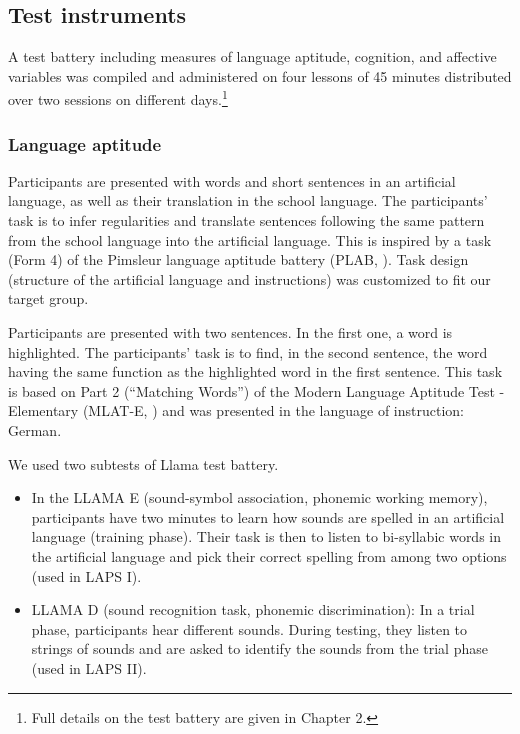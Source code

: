 \documentclass[output=paper]{langsci/langscibook}
\begin{document}
\subsection{Test instruments} 

A test battery including measures of language aptitude, cognition, and affective variables was compiled and administered on four lessons of 45 minutes distributed over two sessions on different days.\footnote{Full details on the test battery are given in Chapter 2.}

\subsubsection{Language aptitude}

\begin{description}\sloppy
\item[Inductive ability (ind):] Participants are presented with words and short sentences in an artificial language, as well as their translation in the school language. The participants’ task is to infer regularities and translate sentences following the same pattern from the school language into the artificial language. This is inspired by a task (Form 4) of the Pimsleur language aptitude battery (PLAB, \citealt{Pimsleur1966}). Task design (structure of the artificial language and instructions) was customized to fit our target group.

\item[Grammatical sensitivity (gra):] Participants are presented with two sentences. In the first one, a word is highlighted. The participants’ task is to find, in the second sentence, the word having the same function as the highlighted word in the first sentence. This task is based on Part 2 (``Matching Words'') of the Modern Language Aptitude Test - Elementary (MLAT-E, \citealt{CarrollSapon1976}) and was presented in the language of instruction: German.

\item[Phonetic coding ability (pho):] We used two subtests of  Llama test battery.

\begin{itemize}
\item In the LLAMA E (sound-symbol association, phonemic working memory), participants have two minutes to learn how sounds are spelled in an artificial language (training phase). Their task is then to listen to bi-syllabic words in the artificial language and pick their correct spelling from among two options (used in LAPS I).
\item LLAMA D (sound recognition task, phonemic discrimination): In a trial phase, participants hear different sounds. During testing, they listen to strings of sounds and are asked to identify the sounds from the trial phase (used in LAPS II).
\end{itemize}
\end{description}
\end{document}
